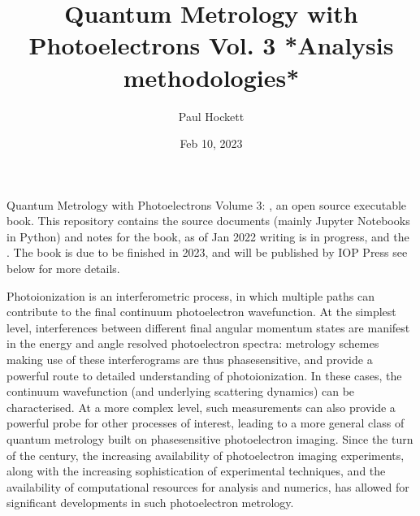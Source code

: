 \documentclass[letterpaper,table,10pt,english]{jupyterBook}
\title{Quantum Metrology with Photoelectrons Vol. 3 *Analysis methodologies*}
\date{Feb 10, 2023}
\author{Paul Hockett}
\begin{document}
\pagestyle{empty}
\sphinxmaketitle
\pagestyle{plain}
\sphinxtableofcontents
\pagestyle{normal}
\label{\detokenize{intro::doc}}


\sphinxAtStartPar
Quantum Metrology with Photoelectrons Volume 3: , an open source executable book. This repository contains the source documents (mainly Jupyter Notebooks in Python) and notes for the book, as of Jan 2022 writing is in progress, and the . The book is due to be finished in 2023, and will be published by IOP Press \sphinxhyphen{} see below for more details.

\begin{DUlineblock}{0em}
\item[] 
\end{DUlineblock}

\sphinxAtStartPar
Photoionization is an interferometric process, in which multiple paths can contribute to the final continuum photoelectron wavefunction. At the simplest level, interferences between different final angular momentum states are manifest in the energy and angle resolved photoelectron spectra: metrology schemes making use of these interferograms are thus phase\sphinxhyphen{}sensitive, and provide a powerful route to detailed understanding of photoionization. In these cases, the continuum wavefunction (and underlying scattering dynamics) can be characterised. At a more complex level, such measurements can also provide a powerful probe for other processes of interest, leading to a more general class of quantum metrology built on phase\sphinxhyphen{}sensitive photoelectron imaging.  Since the turn of the century, the increasing availability of photoelectron imaging experiments, along with the increasing sophistication of experimental techniques, and the availability of computational resources for analysis and numerics, has allowed for significant developments in such photoelectron metrology.

\begin{DUlineblock}{0em}
\item[] 
\end{DUlineblock}
\end{document}
